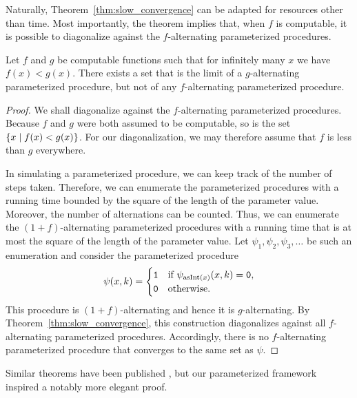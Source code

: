 Naturally, Theorem~\ref{thm:slow_convergence} can be adapted for resources other than time.
Most importantly, the theorem implies that, when $f$ is computable, it is possible to diagonalize against the $f$-alternating parameterized procedures.
\begin{theorem}
\label{thm:computable_hierarchy}
  Let $f$ and $g$ be computable functions such that for infinitely many $x$ we have $f(x) < g(x)$.
  There exists a set that is the limit of a $g$-alternating parameterized procedure, but not of any $f$-alternating parameterized procedure.
\end{theorem}
\begin{proof}
  We shall diagonalize against the $f$-alternating parameterized procedures.
  Because $f$ and $g$ were both assumed to be computable, so is the set $\{x \;{|}\; f(x) < g(x)\}$.
  For our diagonalization, we may therefore assume that $f$ is less than $g$ everywhere.

  In simulating a parameterized procedure, we can keep track of the number of steps taken.
  Therefore, we can enumerate the parameterized procedures with a running time bounded by the square of the length of the parameter value.
  Moreover, the number of alternations can be counted.
  Thus, we can enumerate the $(1 + f)$-alternating parameterized procedures with a running time that is at most the square of the length of the parameter value.
  Let $\psi_1, \psi_2, \psi_3, \ldots$ be such an enumeration and consider the parameterized procedure
  \begin{equation*}
    \psi(x, k) = \begin{cases}
      \textnormal{\texttt{1}}	&\text{if $\psi_{\operatorname{asInt}(x)}(x, k) = \textnormal{\texttt{0}}$}, \\
      \textnormal{\texttt{0}}	&\text{otherwise}.
    \end{cases}
  \end{equation*}
  This procedure is $(1 + f)$-alternating and hence it is $g$-alternating.
  By Theorem~\ref{thm:slow_convergence}, this construction diagonalizes against all $f$-alternating parameterized procedures.
  Accordingly, there is no $f$-alternating parameterized procedure that converges to the same set as $\psi$.
\end{proof}

Similar theorems have been published \parencite{epstein1981hierarchies,arslanov1997degree}, but our parameterized framework inspired a notably more elegant proof.

